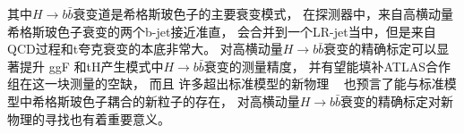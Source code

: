 其中$H\rightarrow b\bar{b}$衰变道是希格斯玻色子的主要衰变模式，
在探测器中，来自高横动量希格斯玻色子衰变的两个b-jet接近准直，
会合并到一个LR-jet当中，但是来自QCD过程和t夸克衰变的本底非常大。
对高横动量$H\rightarrow b\bar{b}$衰变的精确标定可以显著提升
ggF
和tH产生模式中$H\rightarrow b\bar{b}$衰变的测量精度，
并有望能填补ATLAS合作组在这一块测量的空缺，
而且
许多超出标准模型的新物理
~\cite{BSMHIGGS1,BSMHIGGS2,BSMHIGGS3}
也预言了能与标准模型中希格斯玻色子耦合的新粒子的存在，
对高横动量$H\rightarrow b\bar{b}$衰变的精确标定对新物理的寻找也有着重要意义。






